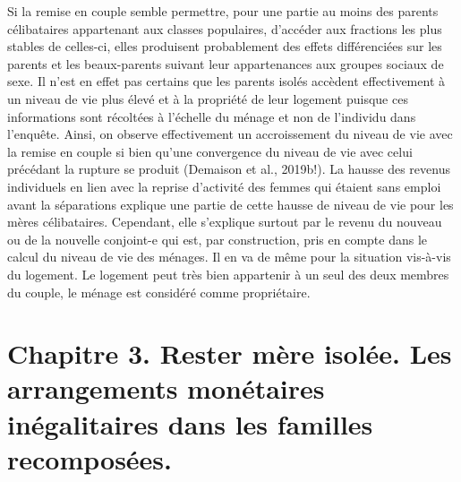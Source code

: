 \documentclass[
  12pt,
]{book}
\begin{document}
Si la remise en couple semble permettre, pour une partie au moins des
parents célibataires appartenant aux classes populaires, d'accéder aux
fractions les plus stables de celles-ci, elles produisent probablement
des effets différenciées sur les parents et les beaux-parents suivant
leur appartenances aux groupes sociaux de sexe. Il n'est en effet pas
certains que les parents isolés accèdent effectivement à un niveau de
vie plus élevé et à la propriété de leur logement puisque ces
informations sont récoltées à l'échelle du ménage et non de l'individu
dans l'enquête. Ainsi, on observe effectivement un accroissement du
niveau de vie avec la remise en couple si bien qu'une convergence du
niveau de vie avec celui précédant la rupture se produit (Demaison et
al., 2019b!). La hausse des revenus individuels en lien avec la reprise
d'activité des femmes qui étaient sans emploi avant la séparations
explique une partie de cette hausse de niveau de vie pour les mères
célibataires. Cependant, elle s'explique surtout par le revenu du
nouveau ou de la nouvelle conjoint-e qui est, par construction, pris en
compte dans le calcul du niveau de vie des ménages. Il en va de même
pour la situation vis-à-vis du logement. Le logement peut très bien
appartenir à un seul des deux membres du couple, le ménage est considéré
comme propriétaire.

\chapter{Chapitre 3. Rester mère isolée. Les arrangements monétaires
inégalitaires dans les familles
recomposées.}\label{chapitre-3.-rester-muxe8re-isoluxe9e.-les-arrangements-monuxe9taires-inuxe9galitaires-dans-les-familles-recomposuxe9es.}
\end{document}
